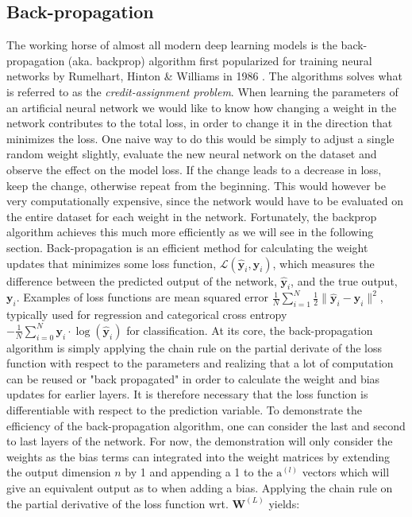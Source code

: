 \documentclass[a4paper,11pt]{article}
\begin{document}
\subsection{Back-propagation}
\label{sec:backprop}
The working horse of almost all modern deep learning models is the back-propagation (aka. backprop) algorithm first popularized for training neural networks by Rumelhart, Hinton \& Williams in 1986 \cite{rumelhart1986learning}. The algorithms solves what is referred to as the \textit{credit-assignment problem}. When learning the parameters of an artificial neural network we would like to know how changing a weight in the network contributes to the total loss, in order to change it in the direction that minimizes the loss. One naive way to do this would be simply to adjust a single random weight slightly, evaluate the new neural network on the dataset and observe the effect on the model loss. If the change leads to a decrease in loss, keep the change, otherwise repeat from the beginning. This would however be very computationally expensive, since the network would have to be evaluated on the entire dataset for each weight in the network. Fortunately, the backprop algorithm achieves this much more efficiently as we will see in the following section. 
\newpage
Back-propagation is an efficient method for calculating the weight updates that minimizes some loss function, $\mathcal{L}(\hat{\mathbf{y}}_i, \mathbf{y}_i)$, which measures the difference between the predicted output of the network, $\hat{\mathbf{y}}_i$, and the true output, $\mathbf{y}_i$. Examples of loss functions are mean squared error $\frac{1}{N}\sum_{i=1}^{N}{\frac{1}{2}\lVert\hat{\mathbf{y}}_i - \mathbf{y}_i \rVert^2}$, typically used for regression and categorical cross entropy $-\frac{1}{N}\sum_{i=0}^{N}{\mathbf{y}_i \cdot \log(\hat{\mathbf{y}}_i)}$ for classification. At its core, the back-propagation algorithm is simply applying the chain rule on the partial derivate of the loss function with respect to the parameters and realizing that a lot of computation can be reused or "back propagated" in order to calculate the weight and bias updates for earlier layers. It is therefore necessary that the loss function is differentiable with respect to the prediction variable. To demonstrate the efficiency of the back-propagation algorithm, one can consider the last and second to last layers of the network. For now, the demonstration will only consider the weights as the bias terms can integrated into the weight matrices by extending the output dimension $n$ by 1 and appending a 1 to the $\mathrm{a}^{(l)}$ vectors which will give an equivalent output as to when adding a bias. Applying the chain rule on the partial derivative of the loss function wrt. $\mathbf{W}^{(L)}$ yields:
\end{document}

